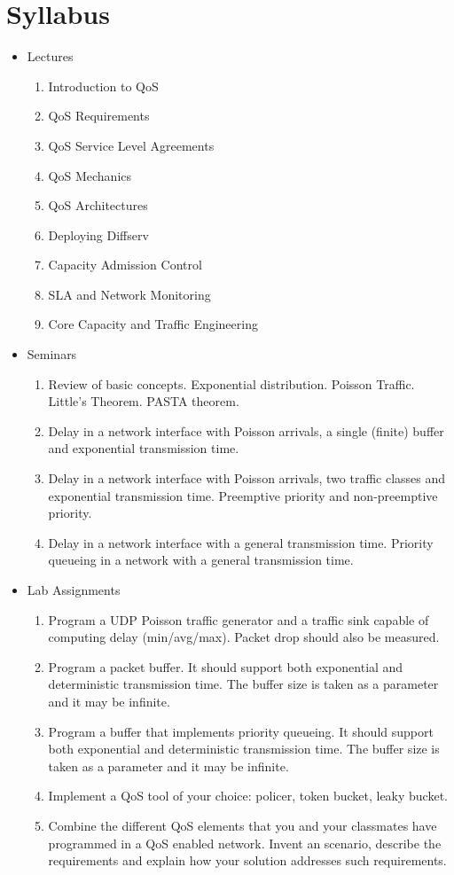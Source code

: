 \section{Syllabus}
\begin{itemize}
  \item Lectures
  \begin{enumerate}
    \item Introduction to QoS
    \item QoS Requirements
    \item QoS Service Level Agreements
    \item QoS Mechanics
    \item QoS Architectures
    \item Deploying Diffserv
    \item Capacity Admission Control
    \item SLA and Network Monitoring
    \item Core Capacity and Traffic Engineering
  \end{enumerate}
  \item Seminars
  \begin{enumerate}
    \item Review of basic concepts. Exponential distribution. Poisson Traffic. Little's Theorem. PASTA theorem.
    \item Delay in a network interface with Poisson arrivals, a single (finite) buffer and exponential transmission time.
    \item Delay in a network interface with Poisson arrivals, two traffic classes and exponential transmission time. Preemptive priority and non-preemptive priority.
    \item Delay in a network interface with a general transmission time. Priority queueing in a network with a general transmission time.
  \end{enumerate}
\item Lab Assignments
  \begin{enumerate}
    \item Program a UDP Poisson traffic generator and a traffic sink capable of computing delay (min/avg/max). Packet drop should also be measured.
    \item Program a packet buffer. It should support both exponential and deterministic transmission time. The buffer size is taken as a parameter and it may be infinite.
    \item Program a buffer that implements priority queueing. It should support both exponential and deterministic transmission time. The buffer size is taken as a parameter and it may be infinite.
    \item Implement a QoS tool of your choice: policer, token bucket, leaky bucket.
    \item Combine the different QoS elements that you and your classmates have programmed in a QoS enabled network. Invent an scenario, describe the requirements and explain how your solution addresses such requirements.
  \end{enumerate}
\end{itemize}

